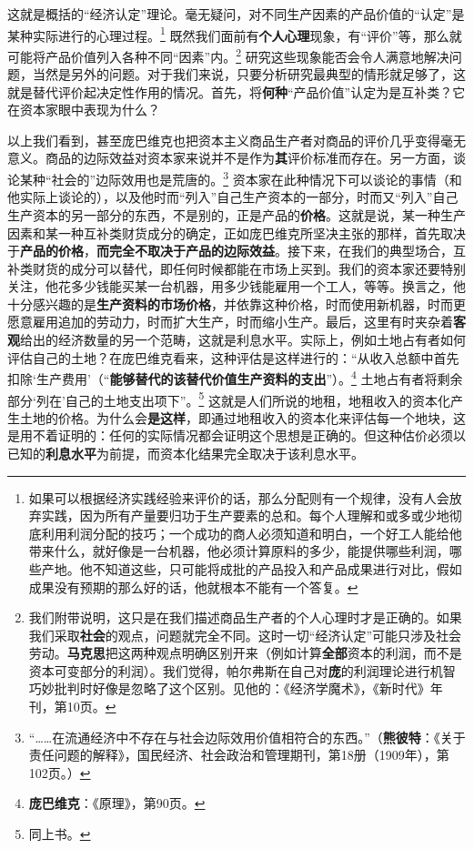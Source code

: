 \documentclass[fontset=fandol, a4paper, 12pt, openright]{ctexbook}
\begin{document}
这就是概括的“经济认定”理论。毫无疑问，对不同生产因素的产品价值的“认定”是某种实际进行的心理过程。\footnote{如果可以根据经济实践经验来评价的话，那么分配则有一个规律，没有人会放弃实践，因为所有产量要归功于生产要素的总和。每个人理解和或多或少地彻底利用利润分配的技巧；一个成功的商人必须知道和明白，一个好工人能给他带来什么，就好像是一台机器，他必须计算原料的多少，能提供哪些利润，哪些产地。他不知道这些，只可能将成批的产品投入和产品成果进行对比，假如成果没有预期的那么好的话，他就根本不能有一个答复。} 既然我们面前有\textbf{个人心理}现象，有“评价”等，那么就可能将产品价值列入各种不同“因素”内。\footnote{我们附带说明，这只是在我们描述商品生产者的个人心理时才是正确的。如果我们采取\textbf{社会}的观点，问题就完全不同。这时一切“经济认定”可能只涉及社会劳动。\textbf{马克思}把这两种观点明确区别开来（例如计算\textbf{全部}资本的利润，而不是资本可变部分的利润）。我们觉得，帕尔弗斯在自己对\textbf{庞}的利润理论进行机智巧妙批判时好像是忽略了这个区别。见他的：《经济学魔术》，《新时代》年刊，第10页。} 研究这些现象能否会令人满意地解决问题，当然是另外的问题。对于我们来说，只要分析研究最典型的情形就足够了，这就是替代评价起决定性作用的情况。首先，将\textbf{何种}“产品价值”认定为是互补类？它在资本家眼中表现为什么？

以上我们看到，甚至庞巴维克也把资本主义商品生产者对商品的评价几乎变得毫无意义。商品的边际效益对资本家来说并不是作为\textbf{其}评价标准而存在。另一方面，谈论某种“社会的”边际效用也是荒唐的。\footnote{“……在流通经济中不存在与社会边际效用价值相符合的东西。”（\textbf{熊彼特}：《关于责任问题的解释》，国民经济、社会政治和管理期刊，第18册（1909年），第102页。）} 资本家在此种情况下可以谈论的事情（和他实际上谈论的），以及他时而“列入”自己生产资本的一部分，时而又“列入”自己生产资本的另一部分的东西，不是别的，正是产品的\textbf{价格}。这就是说，某一种生产因素和某一种互补类财货成分的确定，正如庞巴维克所坚决主张的那样，首先取决于\textbf{产品的价格}，\textbf{而完全不取决于产品的边际效益}。接下来，在我们的典型场合，互补类财货的成分可以替代，即任何时候都能在市场上买到。我们的资本家还要特别关注，他花多少钱能买某一台机器，用多少钱能雇用一个工人，等等。换言之，他十分感兴趣的是\textbf{生产资料的市场价格}，并依靠这种价格，时而使用新机器，时而更愿意雇用追加的劳动力，时而扩大生产，时而缩小生产。最后，这里有时夹杂着\textbf{客观}给出的经济数量的另一个范畴，这就是利息水平。实际上，例如土地占有者如何评估自己的土地？在庞巴维克看来，这种评估是这样进行的：“从收入总额中首先扣除‘生产费用’（“\textbf{能够替代的该替代价值生产资料的支出}”）。\footnote{\textbf{庞巴维克}：《原理》，第90页。} 土地占有者将剩余部分‘列在’自己的土地支出项下”。\footnote{同上书。} 这就是人们所说的地租，地租收入的资本化产生土地的价格。为什么会\textbf{是这样}，即通过地租收入的资本化来评估每一个地块，这是用不着证明的：任何的实际情况都会证明这个思想是正确的。但这种估价必须以已知的\textbf{利息水平}为前提，而资本化结果完全取决于该利息水平。
\end{document}
